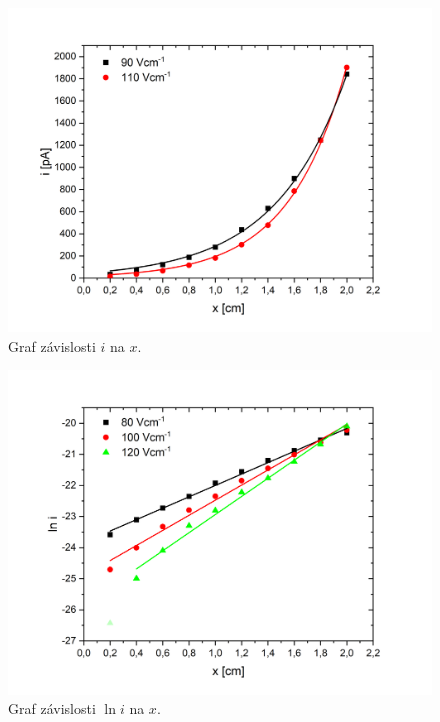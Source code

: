 \documentclass[a4paper,12pt]{article}
\begin{document}
\begin{figure}[h!]
	\centering
	\includegraphics[width=145mm]{ifx90-110.png}
	\caption{Graf závislosti $i$ na $x$.}
	\label{ifx90-110}
\end{figure}


\begin{figure}[h!]
	\centering
	\includegraphics[width=145mm]{lni80-120.png}
	\caption{Graf závislosti $\ln i$ na $x$.}
	\label{lni80-120}
\end{figure}
\end{document}
